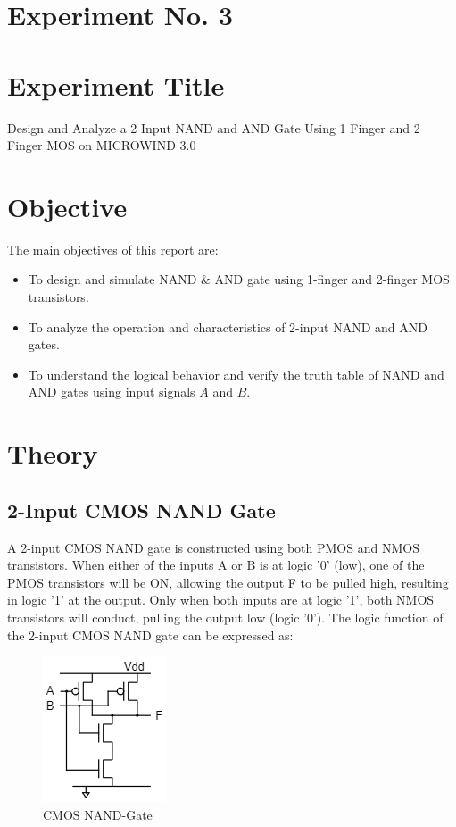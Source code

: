 \documentclass[a4paper,12pt]{article}
\begin{document}
	\section{Experiment No. 3}
	
	
	\section{Experiment Title }
	Design and Analyze a 2 Input NAND and AND Gate Using 1 Finger and 2 Finger MOS on
	MICROWIND 3.0
	\section{Objective}
	The main objectives of this report are:
	\begin{itemize}
		\item To design and simulate NAND \& AND gate using 1-finger and 2-finger MOS transistors.
	 \item To analyze the operation and characteristics of 2-input NAND and AND gates.
	\item To understand the logical behavior and verify the truth table of NAND and AND gates using input signals \(A\) and \(B\).
	\end{itemize}
	\section{Theory}

	
	\subsection{2-Input CMOS NAND Gate}
	A 2-input CMOS NAND gate is constructed using both PMOS and NMOS transistors. When either of the inputs A or B is at logic '0' (low), one of the PMOS transistors will be ON, allowing the output F to be pulled high, resulting in logic '1' at the output. Only when both inputs are at logic '1', both NMOS transistors will conduct, pulling the output low (logic '0'). The logic function of the 2-input CMOS NAND gate can be expressed as:
	
	
\begin{figure}[H]
	\centering
	\includegraphics[width=0.35\linewidth]{Images/7}
	\caption{CMOS NAND-Gate}
	\label{fig:7}
\end{figure}
	
\end{document}
